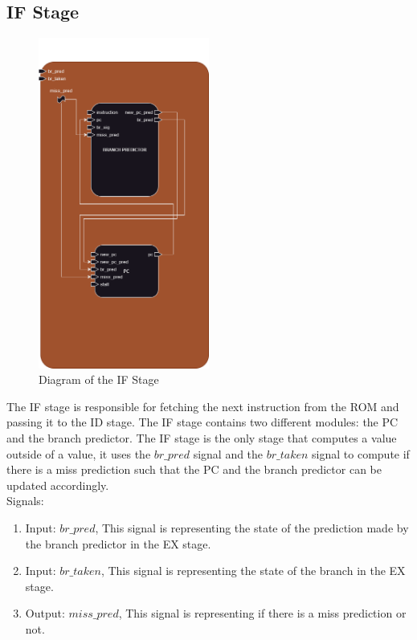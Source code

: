 \subsection{IF Stage}

\begin{figure}[H]
\centering
\includegraphics[width=0.5\textwidth]{../diagrams/fetch/if_stage.png}
\caption{Diagram of the IF Stage}
\label{fig:IF_Stage}
\end{figure}

The IF stage is responsible for fetching the next instruction from the ROM and passing it to the ID stage. 
The IF stage contains two different modules: the PC and the branch predictor.
The IF stage is the only stage that computes a value outside of a value, it uses the $br\_pred$ signal and the 
$br\_taken$ signal to compute if there is a miss prediction such that the PC and the branch predictor can be updated
accordingly. \\

Signals:
\begin{enumerate}[label={\textbullet}]
    \item Input: $br\_pred$, This signal is representing the state of the prediction made by the branch predictor in the EX stage.
    \item Input: $br\_taken$, This signal is representing the state of the branch in the EX stage.
    \item Output: $miss\_pred$, This signal is representing if there is a miss prediction or not.
\end{enumerate}
